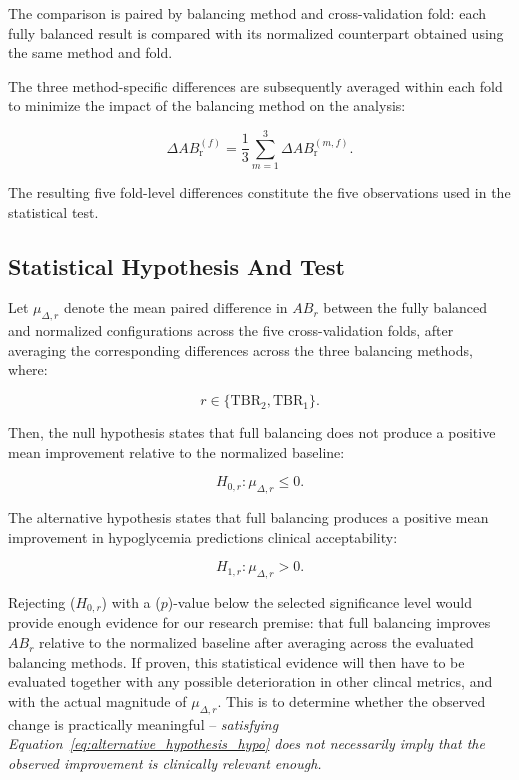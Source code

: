 The comparison is paired by balancing method and cross-validation fold: each fully balanced result is compared with its normalized counterpart obtained using the same method and fold.

The three method-specific differences are subsequently averaged within each fold to minimize the impact of the balancing method on the analysis:

\begin{equation}
\Delta AB_{\mathrm{r}}^{(f)}
=
\frac{1}{3}
\sum_{m=1}^{3}
\Delta AB_{\mathrm{r}}^{(m,f)}.
\label{eq:fold_mean_delta_ab_hypo}
\end{equation}

The resulting five fold-level differences constitute the five observations used in
the statistical test.

\subsection{Statistical Hypothesis And Test}
\label{subsec:statistical_hypotheses}

Let \(\mu_{\Delta,r}\) denote the mean paired difference in \(AB_r\) between the fully balanced and normalized configurations across the five cross-validation folds, after averaging the corresponding differences across the three balancing methods, where:

\begin{equation}
r \in \{\mathrm{TBR_2},\mathrm{TBR_1}\}.
\end{equation}

Then, the null hypothesis states that full balancing does not produce a positive mean improvement relative to the normalized baseline:

\begin{equation}
H_{0,r}:
\mu_{\Delta,r} \leq 0.
\label{eq:null_hypothesis_hypo}
\end{equation}

The alternative hypothesis states that full balancing produces a positive mean improvement in hypoglycemia predictions clinical acceptability:

\begin{equation}
H_{1,r}:
\mu_{\Delta,r} > 0.
\label{eq:alternative_hypothesis_hypo}
\end{equation}

Rejecting ($H_{0,r}$) with a ($p$)-value below the selected significance level would provide enough evidence for our research premise: that full balancing improves \(AB_r\) relative to the normalized baseline after averaging across the evaluated balancing methods. If proven, this statistical evidence will then have to be evaluated together with any possible deterioration in other clincal metrics, and with the actual magnitude of \(\mu_{\Delta,r}\). This is to determine whether the observed change is practically meaningful -- \textit{satisfying Equation~\ref{eq:alternative_hypothesis_hypo} does not necessarily imply that the observed improvement is clinically relevant enough.}

